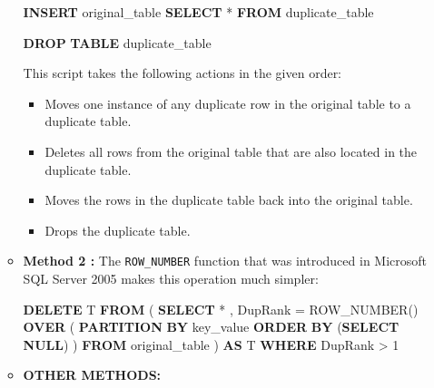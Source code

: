 \documentclass[12pt, french]{article}
\providecommand{\tightlist}{%
      \setlength{\itemsep}{0pt}\setlength{\parskip}{0pt}}
\newenvironment{Shaded}{}{}
\newcommand{\KeywordTok}[1]{\textcolor[rgb]{0.00,0.44,0.13}{\textbf{{#1}}}}
\newcommand{\DecValTok}[1]{\textcolor[rgb]{0.25,0.63,0.44}{{#1}}}
\newcommand{\FunctionTok}[1]{\textcolor[rgb]{0.02,0.16,0.49}{{#1}}}
\newcommand{\NormalTok}[1]{{#1}}
\newcommand{\OperatorTok}[1]{\textcolor[rgb]{0.40,0.40,0.40}{{#1}}}
\begin{document}
\begin{enumerate}
\begin{itemize}
\begin{Shaded}
\begin{Highlighting}[]
\KeywordTok{INSERT}\NormalTok{ original\_table}
\KeywordTok{SELECT} \OperatorTok{*}
\KeywordTok{FROM}\NormalTok{ duplicate\_table}

\KeywordTok{DROP} \KeywordTok{TABLE}\NormalTok{ duplicate\_table}
\end{Highlighting}
\end{Shaded}

    This script takes the following actions in the given order:

    \begin{itemize}
    \tightlist
    \item
      Moves one instance of any duplicate row in the original table to a
      duplicate table.
    \item
      Deletes all rows from the original table that are also located in
      the duplicate table.
    \item
      Moves the rows in the duplicate table back into the original
      table.
    \item
      Drops the duplicate table.
    \end{itemize}
  \item
    \textbf{Method 2 :} The \texttt{ROW\_NUMBER} function that was
    introduced in Microsoft SQL Server 2005 makes this operation much
    simpler:

\begin{Shaded}
\begin{Highlighting}[]
\KeywordTok{DELETE}\NormalTok{ T}
\KeywordTok{FROM}
\NormalTok{(}
\KeywordTok{SELECT} \OperatorTok{*}
\NormalTok{, DupRank }\OperatorTok{=} \FunctionTok{ROW\_NUMBER}\NormalTok{() }\KeywordTok{OVER}\NormalTok{ (}
            \KeywordTok{PARTITION} \KeywordTok{BY}\NormalTok{ key\_value}
            \KeywordTok{ORDER} \KeywordTok{BY}\NormalTok{ (}\KeywordTok{SELECT} \KeywordTok{NULL}\NormalTok{)}
\NormalTok{            )}
\KeywordTok{FROM}\NormalTok{ original\_table}
\NormalTok{) }\KeywordTok{AS}\NormalTok{ T}
\KeywordTok{WHERE}\NormalTok{ DupRank }\OperatorTok{\textgreater{}} \DecValTok{1}
\end{Highlighting}
\end{Shaded}
  \item
    \textbf{OTHER METHODS:}


\end{itemize}
\end{enumerate}
\end{document}
